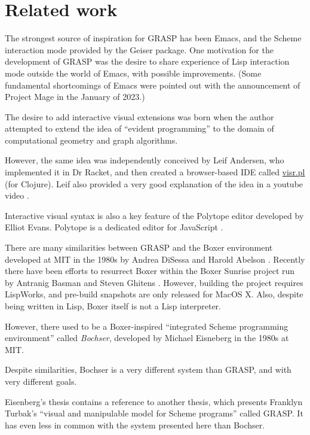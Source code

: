 \documentclass[sigconf]{acmart}
\begin{document}
\section{Related work}

The strongest source of inspiration for GRASP
has been Emacs\cite{Stallman}, and the Scheme interaction
mode provided by the Geiser package. One
motivation for the development of GRASP was
the desire to share experience of Lisp interaction
mode outside the world of Emacs, with possible
improvements. (Some fundamental shortcomings
of Emacs were pointed out with the announcement
of Project Mage in the January of 2023\cite{Korobeinikov}.)

The desire to add interactive visual extensions
was born when the author attempted to extend
the idea of ``evident programming'' to the domain
of computational geometry and graph algorithms.

However, the same idea was independently
conceived by Leif Andersen, who implemented
it in Dr Racket, and then created a browser-based
IDE called \url{visr.pl} (for Clojure). Leif also provided
a very good explanation of the idea in a youtube video \cite{Andersen}.

Interactive visual syntax is also a key feature
of the Polytope editor developed by Elliot Evans.
Polytope is a dedicated editor for JavaScript \cite{Evans}.

There are many similarities between GRASP and
the Boxer environment developed at MIT in the 1980s
by Andrea DiSessa and Harold Abelson \cite{Boxer}. Recently
there have been efforts to resurrect Boxer
within the Boxer Sunrise project run by Antranig
Basman and Steven Ghitens \cite{BoxerSunrise}. However, building
the project requires LispWorks, and pre-build
snapshots are only released for MacOS X. Also,
despite being written in Lisp, Boxer itself
is not a Lisp interpreter.

However, there used to be a Boxer-inspired ``integrated Scheme
programming environment'' called \textit{Bochser},
developed by Michael Eisneberg in the 1980s at MIT\cite{Bochser}.

Despite similarities, Bochser is a very different
system than GRASP, and with very different goals.

Eisenberg's thesis contains a reference to another
thesis, which presents Franklyn Turbak's ``visual
and manipulable model for Scheme programs'' called
GRASP\cite{Turbak}. It has even less in common
with the system presented here than Bochser.
\end{document}
